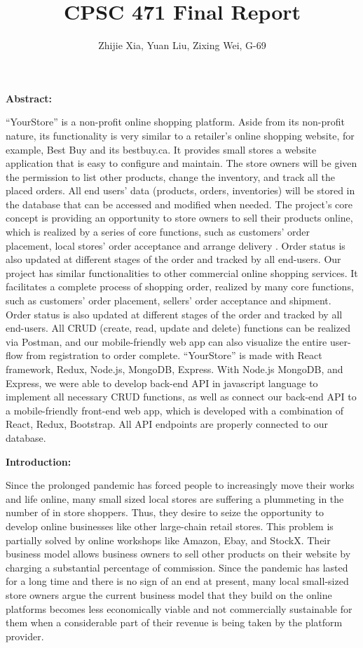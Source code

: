 \documentclass[12pt]{article}
\author{Zhijie Xia, Yuan Liu, Zixing Wei, G-69}
\title{CPSC 471 Final Report}
\begin{document}
\maketitle
\newpage

\textbf{Abstract:}

\vspace*{5mm}
“YourStore” is a non-profit online shopping platform. Aside from its non-profit nature, its functionality is very similar to a retailer’s online shopping website, for example, Best Buy and its bestbuy.ca. It provides small stores a website application that is easy to configure and maintain.
The store owners will be given the permission to list other products, change the inventory, and track all the placed orders. All end users’ data (products, orders, inventories) will be stored in the database that can be accessed and modified when needed. The project’s core concept is providing an opportunity to store owners to sell their
products online, which is realized by a series of core functions, such as customers’ order placement, local stores’ order acceptance and arrange delivery . Order status is also updated at different stages of the order and tracked by all end-users.
Our project has similar functionalities to other commercial online shopping services. It facilitates a complete process of shopping order, realized by many core functions, such as customers’ order placement, sellers’ order acceptance and shipment. Order status is also updated at different stages of the order and tracked by all end-users. All CRUD (create, read, update and delete) functions can be realized via Postman, and our mobile-friendly web app can also visualize the entire user-flow from registration to order complete.
“YourStore” is made with React framework, Redux, Node.js, MongoDB, Express. With Node.js MongoDB, and Express, we were able to develop back-end API in javascript language to implement all necessary CRUD functions, as well as connect our back-end API to a mobile-friendly front-end web app, which is developed with a combination of React, Redux, Bootstrap. All API endpoints are properly connected to our database.


\newpage
\textbf{Introduction:}
\vspace*{5mm}

Since the prolonged pandemic has forced people to increasingly move their works and life online, many small sized 
local stores are suffering a plummeting in the number of in store shoppers. Thus, they desire to seize the opportunity to develop online businesses like other large-chain retail stores. This problem is partially solved by online workshops like Amazon, Ebay, and StockX. 
Their business model allows business owners to sell other products on their website by charging a substantial percentage of commission. Since the pandemic has lasted for a long time and there is no sign of an end at present, many local small-sized store owners argue the current business model that they build on the online platforms becomes less economically viable and not commercially sustainable for them when a considerable part of their revenue is being taken by the platform provider.
\end{document}

